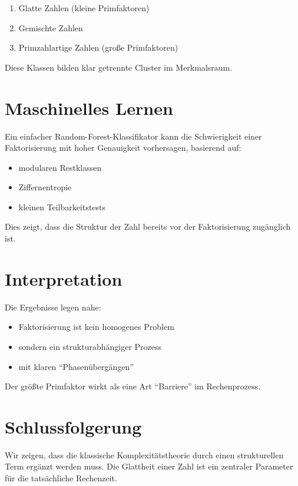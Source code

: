 \documentclass[11pt,a4paper]{article}
\begin{document}
	\begin{enumerate}
		\item Glatte Zahlen (kleine Primfaktoren)
		\item Gemischte Zahlen
		\item Primzahlartige Zahlen (große Primfaktoren)
	\end{enumerate}
	
	Diese Klassen bilden klar getrennte Cluster im Merkmalsraum.
	
	\section{Maschinelles Lernen}
	
	Ein einfacher Random-Forest-Klassifikator kann die Schwierigkeit einer Faktorisierung mit hoher Genauigkeit vorhersagen, basierend auf:
	
	\begin{itemize}
		\item modularen Restklassen
		\item Ziffernentropie
		\item kleinen Teilbarkeitstests
	\end{itemize}
	
	Dies zeigt, dass die Struktur der Zahl bereits vor der Faktorisierung zugänglich ist.
	
	\section{Interpretation}
	
	Die Ergebnisse legen nahe:
	
	\begin{itemize}
		\item Faktorisierung ist kein homogenes Problem
		\item sondern ein strukturabhängiger Prozess
		\item mit klaren ``Phasenübergängen''
	\end{itemize}
	
	Der größte Primfaktor wirkt als eine Art ``Barriere'' im Rechenprozess.
	
	\section{Schlussfolgerung}
	
	Wir zeigen, dass die klassische Komplexitätstheorie durch einen strukturellen Term ergänzt werden muss.
	Die Glattheit einer Zahl ist ein zentraler Parameter für die tatsächliche Rechenzeit.
	
\end{document}
